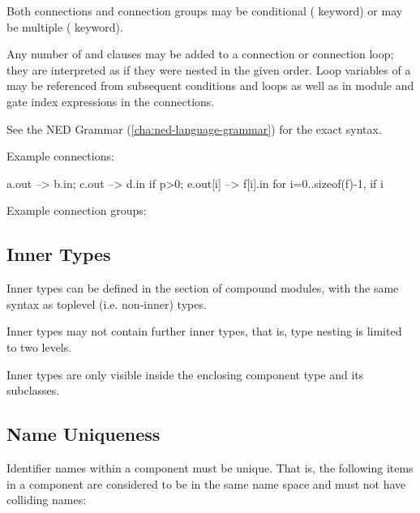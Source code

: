 Both connections and connection groups may be conditional (
keyword) or may be multiple ( keyword).

Any number of  and  clauses may be added to
a connection or connection loop; they are interpreted as if they were
nested in the given order. Loop variables of a  may be
referenced from subsequent conditions and loops as well as in module and
gate index expressions in the connections.

See the NED Grammar (\ref{cha:ned-language-grammar}) for the exact syntax.

Example connections:

\begin{ned}
a.out --> b.in;
c.out --> d.in if p>0;
e.out[i] --> f[i].in for i=0..sizeof(f)-1, if i%
\end{ned}

Example connection groups:




\subsection{Inner Types}
\label{sec:ned-ref:inner-types}

Inner types can be defined in the  section of compound
modules, with the same syntax as toplevel (i.e. non-inner) types.

Inner types may not contain further inner types, that is, type nesting
is limited to two levels.

Inner types are only visible inside the enclosing component type
and its subclasses.



\subsection{Name Uniqueness}
\label{sec:ned-ref:name-uniqueness}

Identifier names within a component must be unique. That is, the following
items in a component are considered to be in the same name space and must
not have colliding names:

